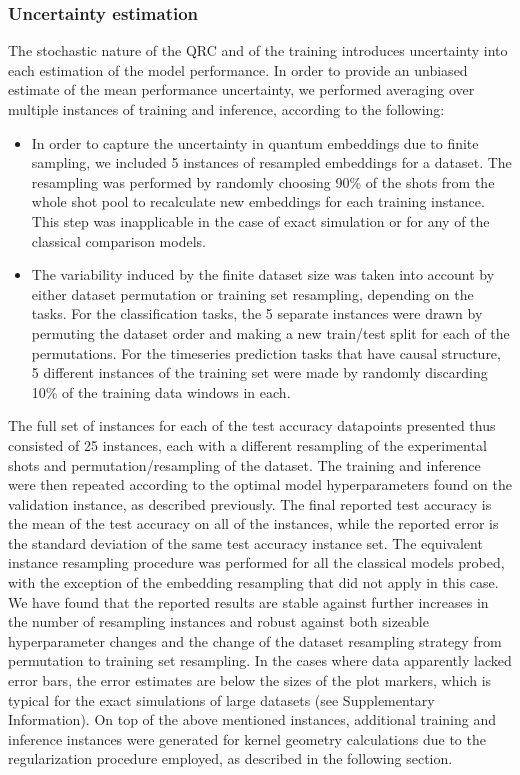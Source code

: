 \documentclass[english,floatfix,twocolumn,showpacs, aps, prx, reprint, superscriptaddress, longbibliography]{revtex4-2}
\begin{document}
\subsubsection{Uncertainty estimation}

The stochastic nature of the QRC and of the training introduces uncertainty into each estimation of the model performance. In order to provide an unbiased estimate of the mean performance uncertainty, we performed averaging over multiple instances of training and inference, according to the following:
\begin{itemize}
    \item In order to capture the uncertainty in quantum embeddings due to finite sampling, we included 5 instances of resampled embeddings for a dataset. The resampling was performed by randomly choosing 90\% of the shots from the whole shot pool to recalculate new embeddings for each training instance. This step was inapplicable in the case of exact simulation or for any of the classical comparison models.
    \item The variability induced by the finite dataset size was taken into account by either dataset permutation or training set resampling, depending on the tasks. For the classification tasks, the 5 separate instances were drawn by permuting the dataset order and making a new train/test split for each of the permutations. For the timeseries prediction tasks that have causal structure, 5 different instances of the training set were made by randomly discarding 10\% of the training data windows in each. 
\end{itemize}
The full set of instances for each of the test accuracy datapoints presented thus consisted of 25 instances, each with a different resampling of the experimental shots and permutation/resampling of the dataset. The training and inference were then repeated according to the optimal model hyperparameters found on the validation instance, as described previously. The final reported test accuracy is the mean of the test accuracy on all of the instances, while the reported error is the standard deviation of the same test accuracy instance set. The equivalent instance resampling procedure was performed for all the classical models probed, with the exception of the embedding resampling that did not apply in this case.  We have found that the reported results are stable against further increases in the number of resampling instances and robust against both sizeable hyperparameter changes and the change of the dataset resampling strategy from permutation to training set resampling. In the cases where data apparently lacked error bars, the error estimates are below the sizes of the plot markers, which is typical for the exact simulations of large datasets (see Supplementary Information). On top of the above mentioned instances, additional training and inference instances were generated for kernel geometry calculations due to the regularization procedure employed, as described in the following section. 
\end{document}
